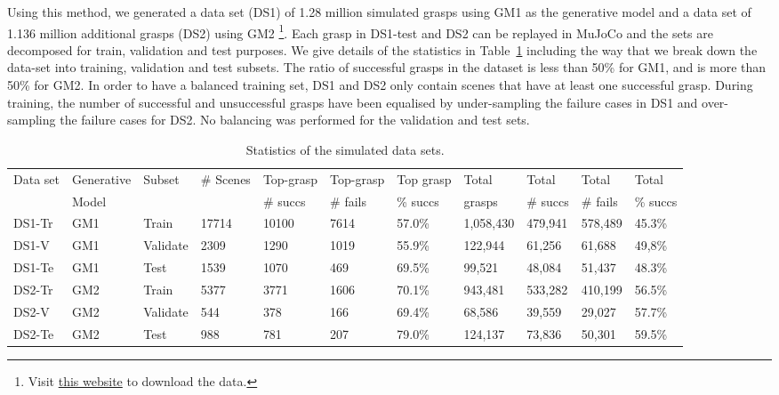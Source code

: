 Using this method, we generated a data set (DS1) of 1.28 million simulated grasps using GM1 as the generative model and a data set of 1.136 million additional grasps (DS2) using GM2 \footnote{Visit \href{https://rusen.github.io/DDG/}{this website} to download the data.}. Each grasp in DS1-test and DS2 can be replayed in MuJoCo and the sets are decomposed for train, validation and test purposes. We give details of the statistics in Table~\ref{tab:data} including the way that we break down the data-set into training, validation and test subsets. The ratio of successful grasps in the dataset is less than 50\% for GM1, and is more than 50\% for GM2. In order to have a balanced training set, DS1 and DS2 only contain scenes that have at least one successful grasp. During training, the number of successful and unsuccessful grasps have been equalised by under-sampling the failure cases in DS1 and over-sampling the failure cases for DS2. No balancing was performed for the validation and test sets.
\begin{table}[t]
\centering
\caption{Statistics of the simulated data sets.}
\label{tab:data}
\begin{tabular}{|l|l|l|l|l|l|l|l|l|l|l|} \hline
Data set & Generative &  Subset & \# Scenes & Top-grasp & Top-grasp & Top grasp & Total & Total  & Total  & Total \\ 
              & Model         &              &                   &  \# succs  & \# fails       & \% succs  & grasps   & \# succs      & \# fails  & \% succs  \\ \hline
 DS1-Tr & GM1 & Train & 17714 & 10100 & 7614 & 57.0\% & 1,058,430 & 479,941 & 578,489 & 45.3\% \\ \hline
 DS1-V  & GM1 & Validate & 2309 & 1290 & 1019 & 55.9\% & 122,944 & 61,256 & 61,688 & 49,8\% \\ \hline
 DS1-Te & GM1& Test & 1539 & 1070 & 469 & 69.5\% & 99,521 & 48,084 & 51,437 & 48.3\% \\ \hline
 DS2-Tr  & GM2 & Train & 5377 & 3771 & 1606 & 70.1\% & 943,481 & 533,282 & 410,199 & 56.5\% \\ \hline
 DS2-V   & GM2 & Validate & 544 & 378 & 166 & 69.4\% & 68,586 & 39,559 & 29,027 & 57.7\% \\ \hline
 DS2-Te  & GM2 & Test & 988 & 781 & 207 & 79.0\% & 124,137 & 73,836 & 50,301 & 59.5\% \\ \hline
\end{tabular}
\end{table}